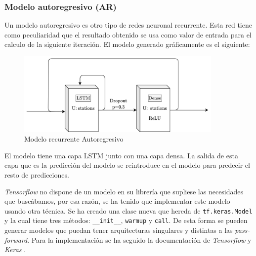 \subsubsection{Modelo autoregresivo (AR)}\label{model_ar}


Un modelo autoregresivo es otro tipo de redes neuronal recurrente. Esta red tiene como peculiaridad que el resultado obtenido se usa como valor de entrada para el calculo de la siguiente iteración. El modelo generado gráficamente es el siguiente:
\begin{figure}[H]
    \centering
    \includegraphics[width=10cm]{images/solution/models/AR.png}
    \caption{Modelo recurrente Autoregresivo}
    \label{fig:dense-model}
\end{figure}

El modelo tiene una capa LSTM junto con una capa densa. La salida de esta capa que es la predicción del modelo se reintroduce en el modelo para predecir el resto de predicciones.
\newline

\textit{Tensorflow} no dispone de un modelo en su librería que supliese las necesidades que buscábamos, por esa razón, se ha tenido que implementar este modelo usando otra técnica. Se ha creado una clase nueva que hereda de \small\verb|tf.keras.Model| y la cual tiene tres métodos: \small\verb|__init__|, \small\verb|warmup| y \small\verb|call|. De esta forma se pueden generar modelos que puedan tener arquitecturas singulares y distintas a las \textit{pass-forward}. Para la implementación se ha seguido la documentación de \textit{Tensorflow} \cite{tensorflow2015-whitepaper} y \textit{Keras} \cite{keras}.
\newline

